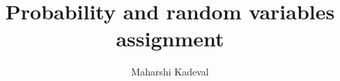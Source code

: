 \documentclass[journal,12pt,twocolumn]{IEEEtran}
\begin{document}
\makeatletter
{}
\makeatother
\let\StandardTheFigure\thefigure
\let\vec\mathbf
\renewcommand{\thefigure}{\theproblem}
\def\putbox#1#2#3{\makebox[0in][l]{\makebox[#1][l]{}\raisebox{\baselineskip}[0in][0in]{\raisebox{#2}[0in][0in]{#3}}}}
     \def\rightbox#1{\makebox[0in][r]{#1}}
     \def\centbox#1{\makebox[0in]{#1}}
     \def\topbox#1{\raisebox{-\baselineskip}[0in][0in]{#1}}
     \def\midbox#1{\raisebox{-0.5\baselineskip}[0in][0in]{#1}}
\vspace{3cm}
\title{Probability and random variables assignment}
\author{Maharshi Kadeval}

\maketitle

\newpage

\bigskip

\end{document}
